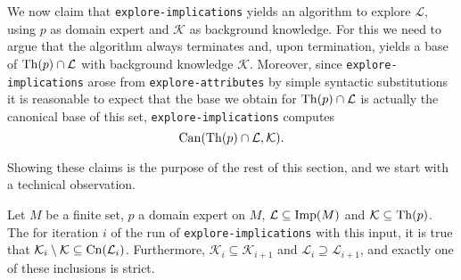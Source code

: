 We now claim that \lstinline{explore-implications} yields an algorithm to explore
$\mathcal{L}$, using $p$ as domain expert and $\mathcal{K}$ as background knowledge.  For
this we need to argue that the algorithm always terminates and, upon termination, yields a
base of $\operatorname{Th}(p) \cap \mathcal{L}$ with background knowledge $\mathcal{K}$.  Moreover,
since \lstinline{explore-implications} arose from \lstinline{explore-attributes} by simple
syntactic substitutions it is reasonable to expect that the base we obtain for $\operatorname{Th}(p)
\cap \mathcal{L}$ is actually the canonical base of this set, \ie
\lstinline{explore-implications} computes
\begin{equation*}
  \operatorname{Can}(\operatorname{Th}(p) \cap \mathcal{L}, \mathcal{K}).
\end{equation*}

Showing these claims is the purpose of the rest of this section, and we start with a
technical observation.
\begin{Proposition}
  \label{prop:technicalities-about-explore-implications}
  Let $M$ be a finite set, $p$ a domain expert on $M$, $\mathcal{L} \subseteq \operatorname{Imp}(M)$ and
  $\mathcal{K} \subseteq \operatorname{Th}(p)$.  The for iteration $i$ of the run of
  \lstinline{explore-implications} with this input, it is true that
  $\mathcal{K}_i\setminus \mathcal{K} \subseteq \operatorname{Cn}(\mathcal{L}_i)$.  Furthermore,
  $\mathcal{K}_i \subseteq \mathcal{K}_{i+1}$ and $\mathcal{L}_i \supseteq
  \mathcal{L}_{i+1}$, and exactly one of these inclusions is strict.
\end{Proposition}
